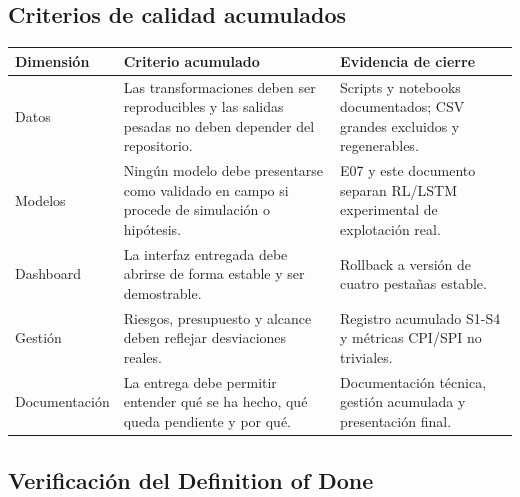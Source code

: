 \documentclass[11pt,a4paper]{article}
\begin{document}
\subsection{Criterios de calidad acumulados}

\begin{table}[H]
\centering
\begin{tabular}{p{4cm}p{5cm}p{5cm}}
\toprule
\textbf{Dimensión} & \textbf{Criterio acumulado} & \textbf{Evidencia de cierre} \\
\midrule
Datos & Las transformaciones deben ser reproducibles y las salidas pesadas no deben depender del repositorio. & Scripts y notebooks documentados; CSV grandes excluidos y regenerables. \\
Modelos & Ningún modelo debe presentarse como validado en campo si procede de simulación o hipótesis. & E07 y este documento separan RL/LSTM experimental de explotación real. \\
Dashboard & La interfaz entregada debe abrirse de forma estable y ser demostrable. & Rollback a versión de cuatro pestañas estable. \\
Gestión & Riesgos, presupuesto y alcance deben reflejar desviaciones reales. & Registro acumulado S1-S4 y métricas CPI/SPI no triviales. \\
Documentación & La entrega debe permitir entender qué se ha hecho, qué queda pendiente y por qué. & Documentación técnica, gestión acumulada y presentación final. \\
\bottomrule
\end{tabular}
\end{table}

\subsection{Verificación del Definition of Done}
\end{document}
